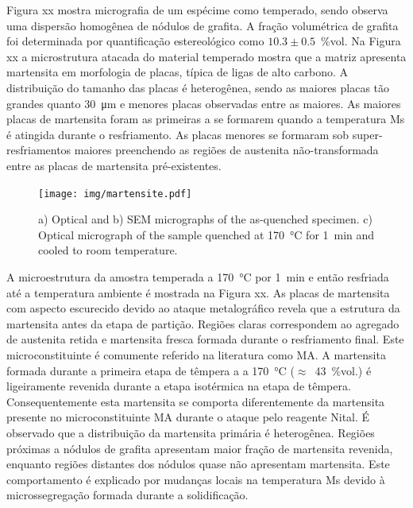 
Figura xx mostra micrografia de um espécime como temperado, sendo observa uma dispersão homogênea de nódulos de grafita. A fração volumétrica de grafita foi determinada por quantificação estereológico como $10.3 \pm 0.5$~\%vol. Na Figura xx a microstrutura atacada do material temperado mostra que a matriz apresenta martensita em morfologia de placas, típica de ligas de alto carbono. A distribuição do tamanho das placas é heterogênea, sendo as maiores placas tão grandes quanto \SI{30}{\micro\meter} e menores placas observadas entre as maiores. As maiores placas de martensita foram as primeiras a se formarem quando a temperatura Ms é atingida durante o resfriamento. As placas menores se formaram sob super-resfriamentos maiores preenchendo as regiões de austenita não-transformada entre as placas de martensita pré-existentes.

\begin{figure}
  \centering
  \texttt{[image: img/martensite.pdf]}
  \caption{a) Optical and b) SEM micrographs of the as-quenched specimen. c) Optical micrograph of the sample quenched at 170~°C for 1~min and cooled to room temperature.}
  \label{fig:tempera}
\end{figure}

A microestrutura da amostra temperada a 170~°C por 1~min e então resfriada até a temperatura ambiente é mostrada na Figura xx. As placas de martensita com aspecto escurecido devido ao ataque metalográfico revela que a estrutura da martensita antes da etapa de partição. Regiões claras correspondem ao agregado de austenita retida e martensita fresca formada durante o resfriamento final. Este microconstituinte é comumente referido na literatura como MA. A martensita formada durante a primeira etapa de têmpera a a 170~°C ($\approx$~43~\%vol.) é ligeiramente revenida durante a etapa isotérmica na etapa de têmpera. Consequentemente esta martensita se comporta diferentemente da martensita presente no microconstituinte MA durante o ataque pelo reagente Nital. É observado que a distribuição da martensita primária é heterogênea. Regiões próximas a nódulos de grafita apresentam maior fração de martensita revenida, enquanto regiões distantes dos nódulos quase não apresentam martensita. Este comportamento é explicado por mudanças locais na temperatura Ms devido à microssegregação formada durante a solidificação.


